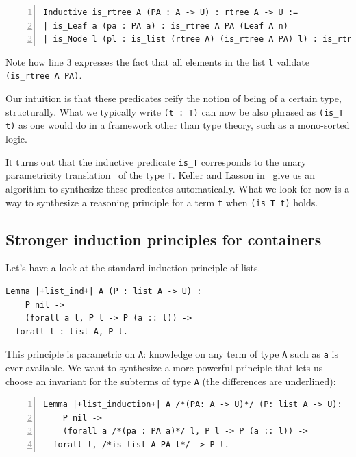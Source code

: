 \documentclass[a4paper,UKenglish,cleveref, autoref]{lipics-v2019}
\begin{document}
\begin{lstlisting}[numbers=left]
Inductive is_rtree A (PA : A -> U) : rtree A -> U :=
| is_Leaf a (pa : PA a) : is_rtree A PA (Leaf A n)
| is_Node l (pl : is_list (rtree A) (is_rtree A PA) l) : is_rtree A PA (Node A l).
\end{lstlisting}

\noindent
Note how line 3 expresses the fact that all elements in the list
\lstinline+l+ validate \lstinline+(is_rtree A PA)+.

Our intuition is that these predicates reify the notion of being
of a certain type, structurally. What we typically write \lstinline+(t : T)+
can now be also phrased as \lstinline+(is_T t)+ as one would do in a
framework other than type theory, such as a mono-sorted logic.

It turns out that the inductive predicate \lstinline+is_T+ corresponds
to the unary parametricity translation~\cite{Wadler:1989:TF:99370.99404}
of the type \lstinline+T+.
Keller and Lasson in~\cite{keller:hal-00730913} give us an
algorithm to synthesize these predicates automatically.
What we look for now is a way to synthesize
a reasoning principle for a term \lstinline+t+ when 
\lstinline+(is_T t)+ holds.

\subsection{Stronger induction principles for containers} %

Let's have a look at the standard induction principle of lists.

\begin{lstlisting}
Lemma |+list_ind+| A (P : list A -> U) :
    P nil ->
    (forall a l, P l -> P (a :: l)) ->
  forall l : list A, P l.
\end{lstlisting}

\noindent
This principle is parametric on \lstinline+A+:
knowledge on any term of type \lstinline+A+ such as \lstinline+a+ is
ever available.
We want to synthesize a more powerful principle that lets us choose
an invariant for the subterms of type \lstinline+A+
(the differences are underlined):

\begin{lstlisting}[numbers=left]
Lemma |+list_induction+| A /*(PA: A -> U)*/ (P: list A -> U):
    P nil ->
    (forall a /*(pa : PA a)*/ l, P l -> P (a :: l)) ->
  forall l, /*is_list A PA l*/ -> P l.
\end{lstlisting}
\end{document}
